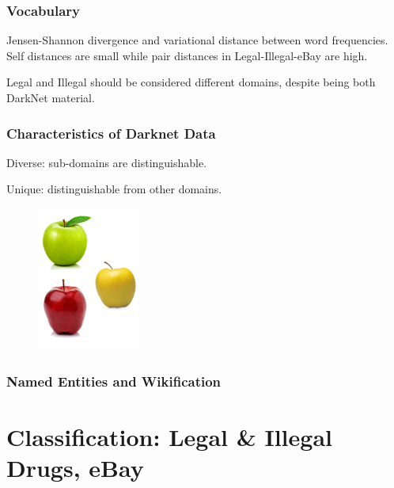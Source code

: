 \documentclass[t,xcolor={svgnames,table}]{beamer}
\begin{document}
\begin{frame}
	\frametitle{Vocabulary}
	Jensen-Shannon divergence and variational distance between word frequencies.
	Self distances are small while pair distances in Legal-Illegal-eBay are high.
	
	Legal and Illegal should be considered different domains, despite being both DarkNet material.

\end{frame}

\begin{frame}
	\frametitle{Characteristics of Darknet Data}
	
	Diverse: sub-domains are distinguishable.
	\vfill
	
	Unique: distinguishable from other domains.
	
	\begin{figure}
		\centering
		\includegraphics[width=0.3\textwidth]{3different.png}
	\end{figure}
\end{frame}

\begin{frame}
	\frametitle{Named Entities and Wikification}
\end{frame}

\section{Classification: Legal \& Illegal Drugs, eBay}
\end{document}

